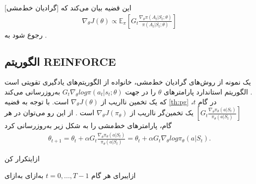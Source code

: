 [گرادیان خط‌مشی] این قضیه بیان می‌کند که
\begin{align}
	\nabla_\theta J(\theta) \propto \mathbb{E}_\pi \left[ G_t \frac{\nabla_\theta \pi (A_t|S_t; \theta)}{\pi(A_t|S_t; \theta)} \right]
	\label{eq:pg}
\end{align}
رجوع شود به 
\cite{suttonbook}.

\subsection{الگوریتم REINFORCE}

یک نمونه از روش‌های گرادیان خط‌مشی، خانواده
از الگوریتم‌های یادگیری تقویتی است
\cite{williams1992simple}.
الگوریتم استاندارد  پارامترهای $\theta$ را در جهت 
$G_t \nabla_\theta  log  \pi (a_t|s_t;\theta)$
 به‌روزرسانی می‌کند که یک تخمین نااریب از
$\nabla_\theta J(\theta)$
است.
با توجه به قضیه 
\ref{th:pg}
در گام $t$،
$\left[ G_t \frac{\nabla_\theta \pi_\theta (a|S_t)}{\pi_\theta (a|S_t)} \right]$
یک تخمین‌گر نااریب از $\nabla_\theta J(\pi_\theta)$ است \cite{suttonbook}. از این رو می‌توان در هر گام، پارامترهای خط‌مشی
 را به شکل زیر به‌روزرسانی کرد
\begin{align}
\theta_{t+1} = \theta_t + \alpha G_t \frac{\nabla_\theta \pi_\theta (a|S_t)}{\pi_\theta (a|S_t)} = \theta_t + \alpha G_t \nabla_\theta log \pi_\theta (a|S_t).
\label{def:updaterule}
\end{align}



‌ازای{تکرار کن}

‌ازای{برای هر گام
$t=0,...,T-1$}
‌به‌ازای
‌به‌ازای

